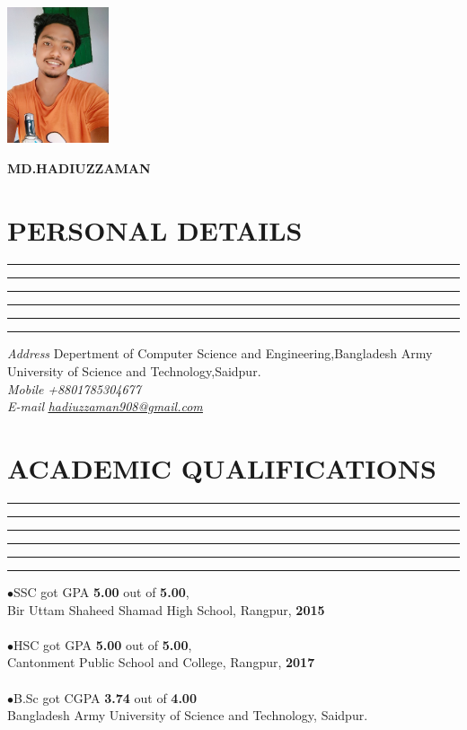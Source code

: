 \documentclass{article}
\begin{document}
	
	\begin{flushright}
		\includegraphics[width=3cm]{pic}	
	\end{flushright}
	\begin{flushright}
	\textbf{\huge MD.HADIUZZAMAN}
	\end{flushright}


\section*{\color{blue}PERSONAL DETAILS}
\hrule \hrule \hrule \hrule \hrule \hrule
\vspace{0.4cm}
\textit{Address}\hspace{0.5cm} Depertment of Computer Science and Engineering,Bangladesh Army
\hspace*{1.8cm}University of Science and Technology,Saidpur.\\
\textit{Mobile}\hspace{0.6cm} \textit{+8801785304677}\\
\textit{E-mail}\hspace{0.6cm} \href{{mailto:hadiuzzaman908@gmail.com}}{\underline{\textit{\color{blue}hadiuzzaman908@gmail.com}}}
\section*{\color{blue}ACADEMIC QUALIFICATIONS }	
\hrule \hrule \hrule \hrule \hrule \hrule
\vspace{0.4cm}
$\bullet $\hspace{0.2cm}SSC got GPA \textbf{5.00} out of \textbf{5.00},\\                                                                                                                   \hspace*{0.4cm}Bir Uttam Shaheed Shamad High School, Rangpur, \textbf{2015}\\
\\
$\bullet $\hspace{0.2cm}HSC got GPA \textbf{5.00} out of \textbf{5.00},\\                                                                                                                       \hspace*{0.4cm}Cantonment Public School and College, Rangpur, \textbf{2017}
\\
\\
$\bullet $\hspace{0.2cm}B.Sc got CGPA \textbf{3.74} out of \textbf{4.00}\\ \hspace*{0.4cm}Bangladesh Army University of Science and Technology, Saidpur.
\end{document}
